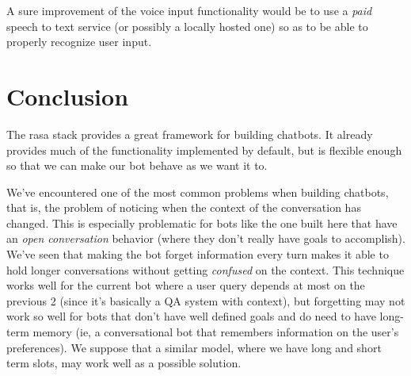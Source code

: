 \documentclass[11pt,a4paper]{article}
\begin{document}
	A sure improvement of the voice input functionality would be to use a \textit{paid} speech to text service (or possibly a locally hosted one) so as to be able to properly recognize user input.

\section{Conclusion}
\label{sec-conclusion}
	
	The rasa stack provides a great framework for building chatbots. It already provides much of the functionality implemented by default, but is flexible enough so that we can make our bot behave as we want it to. 
	
	We've encountered one of the most common problems when building chatbots, that is, the problem of noticing when the context of the conversation has changed. This is especially problematic for bots like the one built here that have an \textit{open conversation} behavior (where they don't really have goals to accomplish). We've seen that making the bot forget information every turn makes it able to hold longer conversations without getting \textit{confused} on the context. This technique works well for the current bot where a user query depends at most on the previous 2 (since it's basically a QA system with context), but forgetting may not work so well for bots that don't have well defined goals and do need to have long-term memory (ie, a conversational bot that remembers information on the user's preferences). We suppose that a similar model, where we have long and short term slots, may work well as a possible solution.
	



%

%


%
\end{document}
